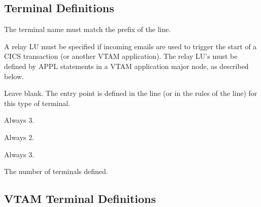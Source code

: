 \documentclass[letterpaper,10pt,english]{sphinxmanual}
\begin{document}
\subsection{Terminal Definitions}
\label{\detokenize{connectivity_guide:index-19}}\label{\detokenize{connectivity_guide:id4}}\begin{description}
\sphinxAtStartPar
The terminal name must match the prefix of the line.

\sphinxAtStartPar
A relay LU must be specified if incoming e\sphinxhyphen{}mails are used to trigger the start of a CICS transaction (or another VTAM application). The relay LU’s must be defined by APPL statements in a VTAM application major node, as described below.

\sphinxAtStartPar
Leave blank. The entry point is defined in the line (or in the rules of the line) for this type of terminal.

\sphinxAtStartPar
Always 3.

\sphinxAtStartPar
Always 2.

\sphinxAtStartPar
Always 3.

\sphinxAtStartPar
The number of terminals defined.

\end{description}

\ignorespaces 

\subsection{VTAM Terminal Definitions}
\label{\detokenize{connectivity_guide:index-20}}\label{\detokenize{connectivity_guide:id5}}
\begin{sphinxVerbatim}[commandchars=\\\{\}]
  
  
  
  
\end{sphinxVerbatim}
\end{document}
